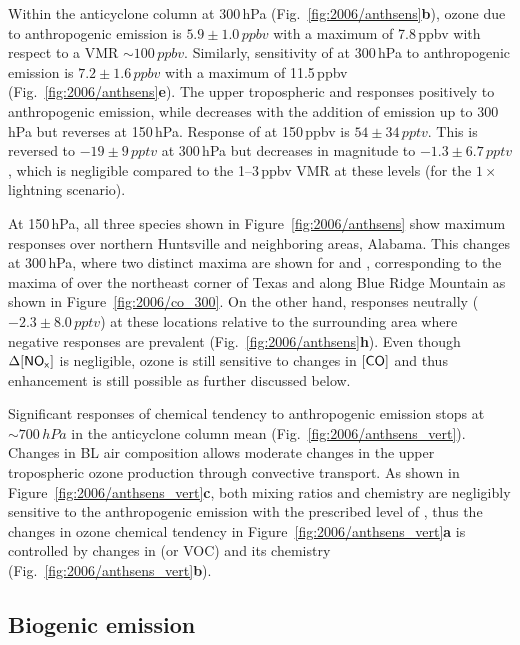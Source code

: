 Within the anticyclone column at 300\,\unit{hPa} (Fig.~\ref{fig:2006/anthsens}{\bf b}), ozone due to anthropogenic emission
is $5.9\pm1.0\,\unit{ppbv}$ with a maximum of 7.8\,\unit{ppbv} with respect to a VMR $\sim100\,\unit{ppbv}$. Similarly,
sensitivity of  at 300\,\unit{hPa} to anthropogenic emission is $7.2\pm1.6\,\unit{ppbv}$ with a maximum of
11.5\,\unit{ppbv} (Fig.~\ref{fig:2006/anthsens}{\bf e}). The upper tropospheric  and  responses
positively to anthropogenic emission, while  decreases with the addition of emission up to 300\,\unit{hPa}
but reverses at 150\,\unit{hPa}. Response of  at 150\,\unit{ppbv} is $54\pm34\,\unit{pptv}$. This is reversed
to $-19\pm9\,\unit{pptv}$ at 300\,\unit{hPa} but decreases in magnitude to $-1.3\pm6.7\,\unit{pptv}$, which is negligible
compared to the 1--3\,\unit{ppbv} VMR at these levels (for the $1\times$ lightning scenario).

At 150\,\unit{hPa}, all three species shown in Figure~\ref{fig:2006/anthsens} show maximum responses over northern Huntsville and neighboring areas,
Alabama. This changes at 300\,\unit{hPa}, where two distinct maxima are shown for  and ,
corresponding to the maxima of  over the northeast corner of Texas and along Blue Ridge Mountain as shown in
Figure~\ref{fig:2006/co_300}. On the other hand,  responses neutrally ($-2.3\pm8.0\,\unit{pptv}$) at
these locations relative to the surrounding area where negative responses are prevalent (Fig.~\ref{fig:2006/anthsens}{\bf h}).
Even though $\Delta[\chem{NO_x}]$ is negligible, ozone is still sensitive to changes in $[\chem{CO}]$ and thus enhancement
is still possible as further discussed below.

Significant responses of chemical tendency to anthropogenic emission stops at $\sim700\,\unit{hPa}$ in the anticyclone
column mean (Fig.~\ref{fig:2006/anthsens_vert}). Changes in BL air composition allows moderate changes in the upper
tropospheric ozone production through convective transport.
As shown in Figure~\ref{fig:2006/anthsens_vert}{\bf c}, both  mixing ratios and  chemistry
are negligibly sensitive to the anthropogenic emission with the prescribed level of {\lnox}, thus the changes in ozone chemical
tendency in Figure~\ref{fig:2006/anthsens_vert}{\bf a} is controlled by changes in  (or VOC) and its chemistry
(Fig.~\ref{fig:2006/anthsens_vert}{\bf b}).

\subsection{Biogenic emission}\label{ssec:2006/sens/bio}

